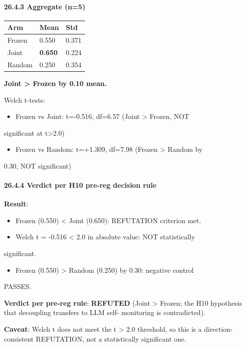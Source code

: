 \documentclass[11pt]{article}
\begin{document}
\paragraph{26.4.3 Aggregate (n=5)}

\begin{tabular}{lll}
Arm & Mean & Std \\
\hline
Frozen & 0.550 & 0.371 \\
Joint & \textbf{0.650} & 0.224 \\
Random & 0.250 & 0.354 \\
\end{tabular}


\textbf{Joint > Frozen by 0.10 mean.}

Welch t-tests:
\begin{itemize}
  \item Frozen vs Joint: t=-0.516, df=6.57 (Joint > Frozen, NOT
\end{itemize}

  significant at t>2.0)
\begin{itemize}
  \item Frozen vs Random: t=+1.309, df=7.98 (Frozen > Random by
\end{itemize}

  0.30, NOT significant)

\paragraph{26.4.4 Verdict per H10 pre-reg decision rule}

\textbf{Result}:
\begin{itemize}
  \item Frozen (0.550) < Joint (0.650): REFUTATION criterion met.
  \item Welch t = -0.516 < 2.0 in absolute value: NOT statistically
\end{itemize}

  significant.
\begin{itemize}
  \item Frozen (0.550) > Random (0.250) by 0.30: negative control
\end{itemize}

  PASSES.

\textbf{Verdict per pre-reg rule}: \textbf{REFUTED} (Joint > Frozen; the
H10 hypothesis that decoupling transfers to LLM self-
monitoring is contradicted).

\textbf{Caveat}: Welch t does not meet the t > 2.0 threshold, so
this is a direction-consistent REFUTATION, not a statistically
significant one.
\end{document}
